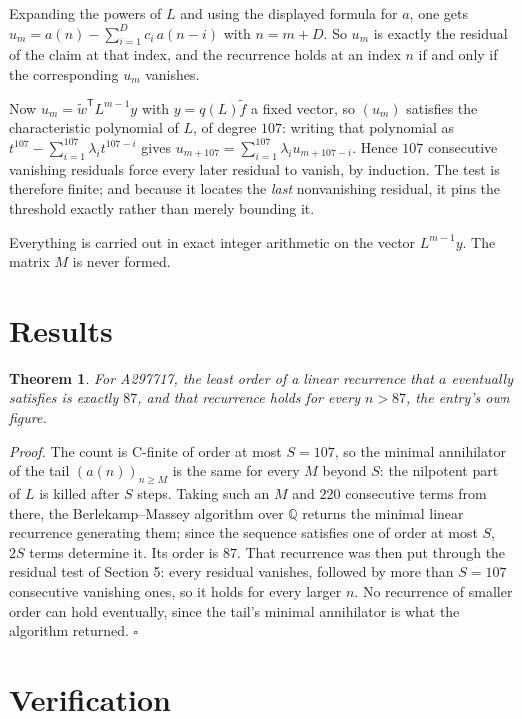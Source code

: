 \documentclass[11pt]{article}
\newtheorem{theorem}{Theorem}
\theoremstyle{definition}
\begin{document}
Expanding the powers of $L$ and using the displayed formula for $a$, one gets $u_m = a(n) - \sum_{i=1}^{D} c_i\,a(n-i)$ with $n = m + D$. So $u_m$ is exactly the residual of the claim at that index, and the recurrence holds at an index $n$ if and only if the corresponding $u_m$ vanishes.

Now $u_m = \tilde w^{\mathsf T} L^{m-1} y$ with $y = q(L)\tilde f$ a fixed vector, so $(u_m)$ satisfies the characteristic polynomial of $L$, of degree $107$: writing that polynomial as $t^{107} - \sum_{i=1}^{107} \lambda_i t^{107-i}$ gives $u_{m+107} = \sum_{i=1}^{107} \lambda_i u_{m+107-i}$. Hence $107$ consecutive vanishing residuals force every later residual to vanish, by induction. The test is therefore finite; and because it locates the {\itshape last} nonvanishing residual, it pins the threshold exactly rather than merely bounding it.

Everything is carried out in exact integer arithmetic on the vector $L^{m-1}y$. The matrix $M$ is never formed.

\section{Results}

\begin{theorem} For A297717, the least order of a linear recurrence that $a$ eventually satisfies is exactly $87$, and that recurrence holds for every $n > 87$, the entry's own figure.\end{theorem}

{\itshape Proof.} The count is C-finite of order at most $S = 107$, so the minimal annihilator of the tail $(a(n))_{n \ge M}$ is the same for every $M$ beyond $S$: the nilpotent part of $L$ is killed after $S$ steps. Taking such an $M$ and $220$ consecutive terms from there, the Berlekamp--Massey algorithm over $\mathbb{Q}$ returns the minimal linear recurrence generating them; since the sequence satisfies one of order at most $S$, $2S$ terms determine it. Its order is $87$. That recurrence was then put through the residual test of Section 5: every residual vanishes, followed by more than $S = 107$ consecutive vanishing ones, so it holds for every larger $n$. No recurrence of smaller order can hold eventually, since the tail's minimal annihilator is what the algorithm returned. $\square$

\section{Verification}
\end{document}
